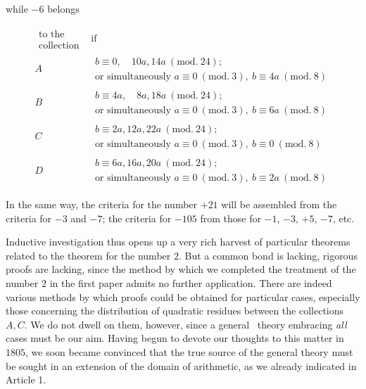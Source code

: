 \begin{center}while $-6$ belongs\end{center}
{\small
\[
\begin{array}{c|l}
\substack{\text{to the}\\\text{collection}}&\text{if}\\
A&\begin{aligned}b\equiv0,\quad10a,14a\ (\mathrm{mod.}\ 24);\\\text{or simultaneously }a\equiv0\ (\mathrm{mod.}\ 3),\ b\equiv4a\ (\mathrm{mod.}\ 8)\end{aligned}\\
B&\begin{aligned}b\equiv4a,\quad8a,18a\ (\mathrm{mod.}\ 24);\\\text{or simultaneously }a\equiv0\ (\mathrm{mod.}\ 3),\ b\equiv6a\ (\mathrm{mod.}\ 8)\end{aligned}\\
C&\begin{aligned}b\equiv2a,12a,22a\ (\mathrm{mod.}\ 24);\\\text{or simultaneously }a\equiv0\ (\mathrm{mod.}\ 3),\ b\equiv0\ (\mathrm{mod.}\ 8)\end{aligned}\\
D&\begin{aligned}b\equiv6a,16a,20a\ (\mathrm{mod.}\ 24);\\\text{or simultaneously }a\equiv0\ (\mathrm{mod.}\ 3),\ b\equiv2a\ (\mathrm{mod.}\ 8)\end{aligned}
\end{array}
\]
}

In the same way, the criteria for the number $+21$ will be assembled from the criteria for $-3$ and $-7$; the criteria for $-105$ from those for $-1$, $-3$, $+5$, $-7$, etc.

Inductive investigation thus opens up a very rich harvest of particular theorems related to the theorem for the number $2$. But a common bond is lacking, rigorous proofs are lacking, since the method by which we completed the treatment of the number $2$ in the first paper admits no further application. There are indeed various methods by which proofs could be obtained for particular cases, especially those concerning the distribution of quadratic residues between the collections $A,C$. We do not dwell on them, however, since a general\ %
 theory embracing \emph{all} cases must be our aim. Having begun to devote our thoughts to this matter in $1805$, we soon became convinced that the true source of the general theory must be sought in an extension of the domain of arithmetic, as we already indicated in Article 1.

